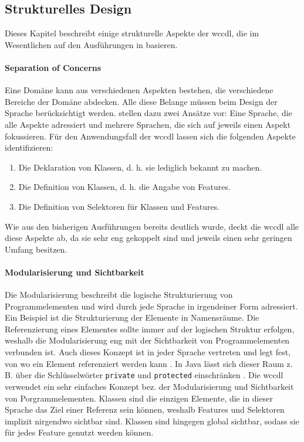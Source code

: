 \subsection{Strukturelles Design}
    Dieses Kapitel beschreibt einige strukturelle Aspekte der \gls{wccdl},
    die im Wesentlichen auf den Ausführungen in \cite[Kapitel 4, 5.1]{voelter:DslEngineering}
    basieren.

    \paragraph{Separation of Concerns}
    Eine Domäne kann aus verschiedenen Aspekten bestehen,
    die verschiedene Bereiche der Domäne abdecken.
    Alle diese Belange müssen beim Design der Sprache berücksichtigt werden.
    \citet[Kapitel 4.1]{voelter:DslEngineering}
    stellen dazu zwei Ansätze vor: Eine Sprache, die alle Aspekte adressiert
    und mehrere Sprachen, die sich auf jeweils einen Aspekt fokussieren.
    Für den Anwendungsfall der \gls{wccdl} lassen sich die
    folgenden Aspekte identifizieren:

    \begin{enumerate}
        \item Die Deklaration von Klassen, d. h. sie lediglich bekannt zu machen.
        \item Die Definition von Klassen, d. h. die Angabe von Features.
        \item Die Definition von Selektoren für Klassen und Features.
    \end{enumerate}

    Wie aus den bisherigen Ausführungen bereits deutlich wurde,
    deckt die \gls{wccdl} alle diese Aspekte ab,
    da sie sehr eng gekoppelt sind und jeweils einen sehr geringen Umfang besitzen.

    \paragraph{Modularisierung und Sichtbarkeit}
    Die Modularisierung beschreibt die logische Strukturierung
    von Programmelementen und wird durch jede Sprache in irgendeiner Form adressiert.
    Ein Beispiel ist die Strukturierung der Elemente in Namensräume.
    Die Referenzierung eines Elementes sollte immer auf der logischen
    Struktur erfolgen, weshalb die Modularisierung eng mit der Sichtbarkeit
    von Programmelementen verbunden ist.
    Auch dieses Konzept ist in jeder Sprache vertreten und legt fest,
    von wo ein Element referenziert werden kann
    \cite[Kapitel 5.1.1]{voelter:DslEngineering}.
    In Java lässt sich dieser Raum z. B. über die Schlüsselwörter
    \texttt{private} und \texttt{protected} einschränken
    \cite[Kapitel 6.6]{oracle:javaSpec}.
    Die \gls{wccdl} verwendet ein sehr einfaches Konzept bez.
    der Modularisierung und Sichtbarkeit von Porgrammelementen.
    Klassen sind die einzigen Elemente, die in dieser Sprache das Ziel einer Referenz
    sein können, weshalb Features und Selektoren implizit nirgendwo sichtbar sind.
    Klassen sind hingegen global sichtbar,
    sodass sie für jedes Feature genutzt werden können.


